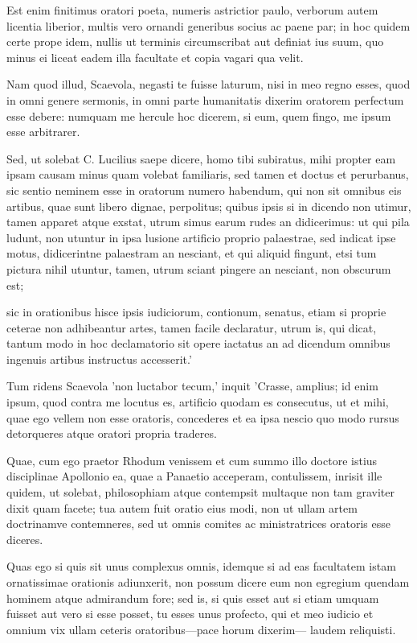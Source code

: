  Est enim finitimus oratori poeta, numeris astrictior paulo, verborum autem licentia liberior, multis vero ornandi generibus socius ac paene par; in hoc quidem certe prope idem, nullis ut terminis circumscribat aut definiat ius suum, quo minus ei liceat eadem illa facultate et copia vagari qua velit.

 Nam quod illud, Scaevola, negasti te fuisse laturum, nisi in meo regno esses, quod in omni genere sermonis, in omni parte humanitatis dixerim oratorem perfectum esse debere: numquam me hercule hoc dicerem, si eum, quem fingo, me ipsum esse arbitrarer.

 Sed, ut solebat C. Lucilius saepe dicere, homo tibi subiratus, mihi propter eam ipsam causam minus quam volebat familiaris, sed tamen et doctus et perurbanus, sic sentio neminem esse in oratorum numero habendum, qui non sit omnibus eis artibus, quae sunt libero dignae, perpolitus; quibus ipsis si in dicendo non utimur, tamen apparet atque exstat, utrum simus earum rudes an didicerimus: ut qui pila ludunt, non utuntur in ipsa lusione artificio proprio palaestrae, sed indicat ipse motus, didicerintne palaestram an nesciant, et qui aliquid fingunt, etsi tum pictura nihil utuntur, tamen, utrum sciant pingere an nesciant, non obscurum est;

 sic in orationibus hisce ipsis iudiciorum, contionum, senatus, etiam si proprie ceterae non adhibeantur artes, tamen facile declaratur, utrum is, qui dicat, tantum modo in hoc declamatorio sit opere iactatus an ad dicendum omnibus ingenuis artibus instructus accesserit.'

 Tum ridens Scaevola 'non luctabor tecum,' inquit 'Crasse, amplius; id enim ipsum, quod contra me locutus es, artificio quodam es consecutus, ut et mihi, quae ego vellem non esse oratoris, concederes et ea ipsa nescio quo modo rursus detorqueres atque oratori propria traderes.

 Quae, cum ego praetor Rhodum venissem et cum summo illo doctore istius disciplinae Apollonio ea, quae a Panaetio acceperam, contulissem, inrisit ille quidem, ut solebat, philosophiam atque contempsit multaque non tam graviter dixit quam facete; tua autem fuit oratio eius modi, non ut ullam artem doctrinamve contemneres, sed ut omnis comites ac ministratrices oratoris esse diceres.

 Quas ego si quis sit unus complexus omnis, idemque si ad eas facultatem istam ornatissimae orationis adiunxerit, non possum dicere eum non egregium quendam hominem atque admirandum fore; sed is, si quis esset aut si etiam umquam fuisset aut vero si esse posset, tu esses unus profecto, qui et meo iudicio et omnium vix ullam ceteris oratoribus—pace horum dixerim— laudem reliquisti.

